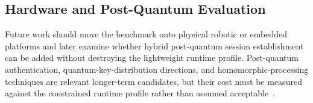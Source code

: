 \subsection*{Hardware and Post-Quantum Evaluation}

Future work should move the benchmark onto physical robotic or embedded platforms and later examine whether hybrid post-quantum session establishment can be added without destroying the lightweight runtime profile. Post-quantum authentication, quantum-key-distribution directions, and homomorphic-processing techniques are relevant longer-term candidates, but their cost must be measured against the constrained runtime profile rather than assumed acceptable~\cite{fathenojavanPostQuantumLatticeAnonymous2025,beraSecuringNextGenerationQuantum2025,ullahHomomorphicEncryptionApplications2025}.

